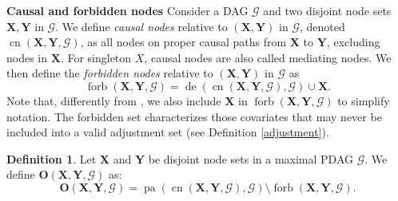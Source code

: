 \documentclass[11pt,a4paper]{article}
\theoremstyle{definition}
\newtheorem{Definition}[Satz]{Definition}
\theoremstyle{remark}
\DeclareMathOperator{\Forbb}{forb}
\DeclareMathOperator{\pa}{pa}
\DeclareMathOperator{\de}{de}
\DeclareMathOperator{\CN}{cn}
\DeclareMathOperator{\possCN}{posscn}
\newcommand{\mpdag}{maximal PDAG}
\newcommand{\g}[1][G]{\mathcal{#1}}
\newcommand{\fb}[2][X,Y]{\Forbb(\mathbf{#1},#2)}
\newcommand{\cnb}[2][X,Y]{\CN(\mathbf{#1},#2)}
\newcommand{\posscnb}[2][X,Y]{\possCN(\mathbf{#1},#2)}
\newcommand{\opt}[2][X,Y]{\mathbf{O}(#1,#2)}
\newcommand{\optb}[2][X,Y]{\mathbf{O}(\mathbf{#1},#2)}
\begin{document}

\noindent \textbf{Causal and forbidden nodes} 
Consider a DAG $\g$ and two disjoint node sets $\mathbf{X},\mathbf{Y}$ in $\g$. We define \textit{causal nodes} relative to $(\mathbf{X,Y})$ in $\g$, denoted $\cnb{\g}$, as all nodes on proper causal paths from $\mathbf{X}$ to $\mathbf{Y}$, excluding nodes in $\mathbf{X}$. 
For singleton $X$, causal nodes are also called mediating nodes. 
We then define the \textit{forbidden nodes} relative to $(\mathbf{X},\mathbf{Y})$ in $\g$ as
\[
\fb{\g} = \de(\cnb{\g}, \g) \cup \mathbf{X}.
\]
Note that, differently from \citet{perkovic16}, we also include $\mathbf{X}$ in $\fb{\g}$ to simplify notation. The forbidden set characterizes those covariates that may never be included into a valid adjustment set (see Definition \ref{adjustment}).


\begin{Definition}
	Let $\mathbf{X}$ and $\mathbf{Y}$ be disjoint node sets in a \mpdag{} $\g$.
	We define $\optb{\g}$ as:
	\[
	\optb{\g} =  \pa( \cnb{\g},\g)\setminus \fb{\g}.    
	\]
	\label{def:optset2}
\end{Definition}

\end{document}
